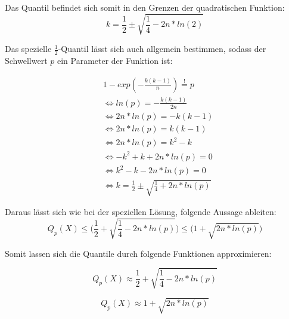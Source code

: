 \documentclass[../main.tex]{subfiles}
\begin{document}
\begin{flushleft}
Das Quantil befindet sich somit in den Grenzen der quadratischen Funktion:
\begin{equation}
 k = \frac{ 1 }{ 2 } \pm \sqrt{ \frac{ 1 }{ 4 } - 2n*ln(2)}
\end{equation}

Das spezielle $ \frac{1}{2} $-Quantil lässt sich auch allgemein bestimmen, sodass der Schwellwert $p$ ein Parameter der Funktion ist:

\begin{align*}
& 1 - exp(-\frac{ k(k-1) }{ n }) \overset{!}{=} p \\
& \Leftrightarrow ln(p) = -\frac{ k(k-1)}{ 2n } \\
& \Leftrightarrow 2n*ln(p) = -k(k-1) \\
& \Leftrightarrow 2n*ln(p) = k(k-1) \\
& \Leftrightarrow 2n*ln(p) = k^{ 2 } - k \\
& \Leftrightarrow - k^{ 2 } + k + 2n*ln(p) = 0 \\
& \Leftrightarrow k^{ 2 } - k - 2n*ln(p) = 0 \\
& \Leftrightarrow k = \frac{ 1 }{ 2 } \pm \sqrt{ \frac{ 1 }{ 4 } + 2n*ln(p)}
\end{align*}

Daraus lässt sich wie bei der speziellen Lösung, folgende Aussage ableiten:
\begin{equation}
Q_{ p }(X) \leq \bigg( \frac{ 1 }{ 2 } + \sqrt{ \frac{ 1 }{ 4 } - 2n*ln(p)} \bigg) \leq \bigg(1+\sqrt{ 2n*ln(p) }\bigg)
\end{equation}

Somit lassen sich die Quantile durch folgende Funktionen approximieren:

\begin{equation}
Q_{ p }(X) \approx \frac{ 1 }{ 2 } + \sqrt{ \frac{ 1 }{ 4 } - 2n*ln(p)}
\end{equation}

\begin{equation}
Q_{ p }(X) \approx 1+\sqrt{ 2n*ln(p) }
\end{equation}







\end{flushleft}
\end{document}
